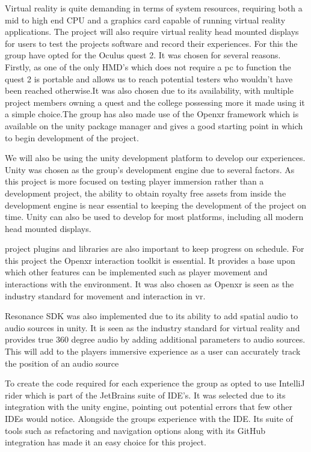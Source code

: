 Virtual reality is quite demanding in terms of system resources, requiring both a mid to high end CPU and a graphics card capable of running virtual reality applications. The project will also require virtual reality head mounted displays for users to test the projects software and record their experiences.  For this the group have opted for the Oculus quest 2. It was chosen for several reasons. Firstly, as one of the only HMD’s which does not require a pc to function the quest 2 is portable and allows us to reach potential testers who wouldn’t have been reached otherwise.It was also chosen due to its availability, with multiple project members owning a quest and the college possessing more it made using it a simple choice.The group has also made use of the Openxr framework which is available on the unity package manager and gives a good starting point in which to begin development of the project. 

 We will also be using the unity development platform to develop our experiences. Unity was chosen as the group's development engine due to several factors. As this project is more focused on testing player immersion rather than a development project, the ability to obtain royalty free assets from inside the development engine is near essential to keeping the development of the project on time. Unity can also be used to develop for most platforms, including all modern head mounted displays.  

project plugins and libraries are also important to keep progress on schedule. For this project the Openxr interaction toolkit is essential. It provides a base upon which other features can be implemented such as player movement and interactions with the environment. It was also chosen as Openxr is seen as the industry standard for movement and interaction in vr. 

Resonance SDK was also implemented due to its ability to add spatial audio to audio sources in unity. It is seen as the industry standard for virtual reality and provides true 360 degree audio by adding additional parameters to audio sources. This will add to the players immersive experience as a user can accurately track the position of an audio source  

To create the code required for each experience the group as opted to use IntelliJ rider which is part of the JetBrains suite of IDE’s. It was selected due to its integration with the unity engine, pointing out potential errors that few other IDEs would notice. Alongside the groups experience with the IDE. Its suite of tools such as refactoring and navigation options along with its GitHub integration has made it an easy choice for this project.

